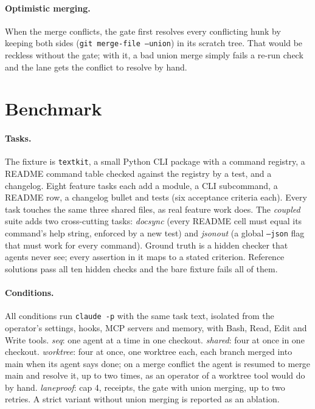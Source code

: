 \documentclass[11pt]{article}
\begin{document}
\paragraph{Optimistic merging.} When the merge conflicts, the gate first resolves every conflicting hunk by keeping
both sides (\texttt{git merge-file --union}) in its scratch tree. That would be reckless without the gate; with it, a
bad union merge simply fails a re-run check and the lane gets the conflict to resolve by hand.

\section{Benchmark}
\paragraph{Tasks.} The fixture is \texttt{textkit}, a small Python CLI package with a command registry, a README
command table checked against the registry by a test, and a changelog. Eight feature tasks each add a module, a CLI
subcommand, a README row, a changelog bullet and tests (six acceptance criteria each). Every task touches the same
three shared files, as real feature work does. The \emph{coupled} suite adds two cross-cutting tasks: \emph{docsync}
(every README cell must equal its command's help string, enforced by a new test) and \emph{jsonout} (a global
\texttt{--json} flag that must work for every command). Ground truth is a hidden checker that agents never see; every
assertion in it maps to a stated criterion. Reference solutions pass all ten hidden checks and the bare fixture fails
all of them.

\paragraph{Conditions.} All conditions run \texttt{claude -p} with the same task text, isolated from the operator's
settings, hooks, MCP servers and memory, with Bash, Read, Edit and Write tools. \emph{seq}: one agent at a time in one
checkout. \emph{shared}: four at once in one checkout. \emph{worktree}: four at once, one worktree each, each branch
merged into main when its agent says done; on a merge conflict the agent is resumed to merge main and resolve it, up
to two times, as an operator of a worktree tool would do by hand. \emph{laneproof}: cap 4, receipts, the gate with
union merging, up to two retries. A strict variant without union merging is reported as an ablation.
\end{document}
